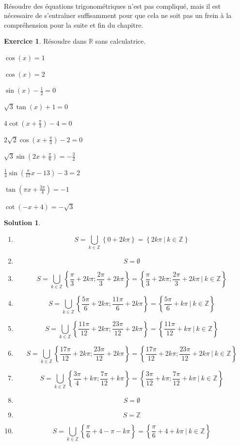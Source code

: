 \documentclass[a4paper,fontsize=13pt]{scrreprt}
\theoremstyle{plain}
\theoremstyle{definition}
\newtheorem{exo}[subsection]{Exercice}
\newtheorem*{solu}{Solution}
\newcommand{\zz}{\mathbb{Z}}
\newcommand{\rr}{\mathbb{R}}
\begin{document}
~\\
Résoudre des équations trigonométriques n'est pas compliqué, mais il est nécessaire de s'entraîner suffisamment pour que cela ne soit pas un frein à la compréhension pour la suite et fin du chapitre.
\begin{exo}
Résoudre dans $\rr$ sans calculatrice.
\begin{enumerate}
\begin{multicols}{2}
\item $\cos(x)=1$
\item $\cos(x)=2$
\item $\sin(x)-\frac{1}{2}=0$
\item $\sqrt{3}\tan(x)+1=0$
\item $4\cot(x+\frac{\pi}{3})-4=0$
\item $2\sqrt{2}\cos(x+\frac{\pi}{3})-2=0$
\item $\sqrt{3}\sin(2x+\frac{\pi}{6})=-\frac{3}{2}$
\item $\frac{1}{4}\sin(\frac{\pi}{17}x-13)-3=2$
\item $\tan(\pi x+\frac{3\pi}{4})=-1$
\item $\cot(-x+4)=-\sqrt{3}$
\end{multicols}
\end{enumerate}
\end{exo}

\begin{solu}
~\\
\begin{enumerate}
\item
$$S=\underset{k\in\zz}\bigcup \left\{0+2k\pi \right\} = \left\{2k\pi ~|~ k \in \zz \right\}$$
\item $$S=\emptyset$$
\item
$$S=\underset{k\in\zz}\bigcup \left\{\frac{\pi}{3}+2k\pi ; \frac{2\pi}{3}+2k\pi \right\} = \left\{\frac{\pi}{3}+2k\pi ; \frac{2\pi}{3}+2k\pi ~|~ k \in \zz \right\}$$
\item
$$S=\underset{k\in\zz}\bigcup \left\{\frac{5\pi}{6}+2k\pi ; \frac{11\pi}{6}+2k\pi \right\} = \left\{\frac{5\pi}{6}+k\pi ~|~ k \in \zz \right\}$$
\item
$$S=\underset{k\in\zz}\bigcup \left\{\frac{11\pi}{12}+2k\pi ; \frac{23\pi}{12}+2k\pi \right\} = \left\{\frac{11\pi}{12}+k\pi ~|~ k \in \zz \right\}$$
\item
$$S=\underset{k\in\zz}\bigcup \left\{\frac{17\pi}{12}+2k\pi ; \frac{23\pi}{12}+2k\pi \right\} = \left\{\frac{17\pi}{12}+2k\pi ; \frac{23\pi}{12}+2k\pi ~|~ k \in \zz \right\}$$
\item
$$S=\underset{k\in\zz}\bigcup \left\{\frac{3\pi}{4}+k\pi ; \frac{7\pi}{12}+k\pi \right\} = \left\{\frac{3\pi}{12}+k\pi ; \frac{7\pi}{12}+k\pi ~|~ k \in \zz \right\}$$
\item $$S=\emptyset$$
\item $$S=\zz$$
\item $$S=\underset{k\in\zz}\bigcup \left\{\frac{\pi}{6}+4-\pi -k\pi \right\} = \left\{\frac{\pi}{6}+4+k\pi ~|~ k \in \zz \right\}$$
\end{enumerate}
\end{solu}
\end{document}
